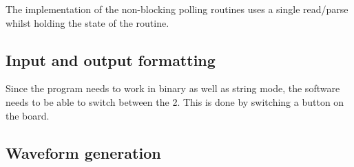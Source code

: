 The implementation of the non-blocking polling routines uses a single read/parse whilst
holding the state of the routine.

\subsection{Input and output formatting}
Since the program needs to work in binary as well as string mode, the software needs to
be able to switch between the 2. This is done by switching a button on the board.

\subsection{Waveform generation}
